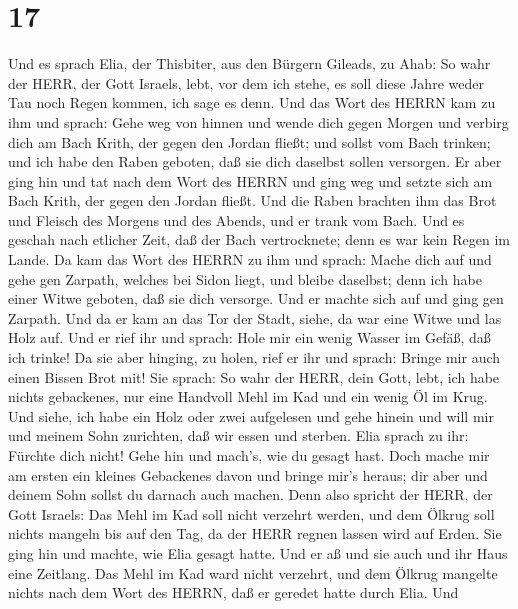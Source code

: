\hypertarget{section-16}{%
\section{17}\label{section-16}}

 Und es sprach Elia, der Thisbiter, aus den Bürgern Gileads,
zu Ahab: So wahr der HERR, der Gott Israels, lebt, vor dem ich stehe, es
soll diese Jahre weder Tau noch Regen kommen, ich sage es denn.
 Und das Wort des HERRN kam zu ihm und sprach: 
Gehe weg von hinnen und wende dich gegen Morgen und verbirg dich am Bach
Krith, der gegen den Jordan fließt;  und sollst vom Bach
trinken; und ich habe den Raben geboten, daß sie dich daselbst sollen
versorgen.  Er aber ging hin und tat nach dem Wort des HERRN
und ging weg und setzte sich am Bach Krith, der gegen den Jordan fließt.
 Und die Raben brachten ihm das Brot und Fleisch des Morgens
und des Abends, und er trank vom Bach.  Und es geschah nach
etlicher Zeit, daß der Bach vertrocknete; denn es war kein Regen im
Lande.  Da kam das Wort des HERRN zu ihm und sprach:
 Mache dich auf und gehe gen Zarpath, welches bei Sidon
liegt, und bleibe daselbst; denn ich habe einer Witwe geboten, daß sie
dich versorge.  Und er machte sich auf und ging gen
Zarpath. Und da er kam an das Tor der Stadt, siehe, da war eine Witwe
und las Holz auf. Und er rief ihr und sprach: Hole mir ein wenig Wasser
im Gefäß, daß ich trinke!  Da sie aber hinging, zu holen,
rief er ihr und sprach: Bringe mir auch einen Bissen Brot mit!
 Sie sprach: So wahr der HERR, dein Gott, lebt, ich habe
nichts gebackenes, nur eine Handvoll Mehl im Kad und ein wenig Öl im
Krug. Und siehe, ich habe ein Holz oder zwei aufgelesen und gehe hinein
und will mir und meinem Sohn zurichten, daß wir essen und sterben.
 Elia sprach zu ihr: Fürchte dich nicht! Gehe hin und
mach's, wie du gesagt hast. Doch mache mir am ersten ein kleines
Gebackenes davon und bringe mir's heraus; dir aber und deinem Sohn
sollst du darnach auch machen.  Denn also spricht der HERR,
der Gott Israels: Das Mehl im Kad soll nicht verzehrt werden, und dem
Ölkrug soll nichts mangeln bis auf den Tag, da der HERR regnen lassen
wird auf Erden.  Sie ging hin und machte, wie Elia gesagt
hatte. Und er aß und sie auch und ihr Haus eine Zeitlang. 
Das Mehl im Kad ward nicht verzehrt, und dem Ölkrug mangelte nichts nach
dem Wort des HERRN, daß er geredet hatte durch Elia.  Und
